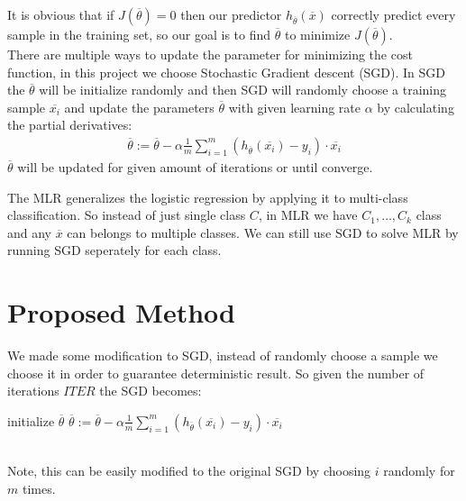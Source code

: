 \documentclass{sig-alternate-05-2015}
\begin{document}
It is obvious that if $J(\overline{\theta}) = 0$ then our predictor $h_{\overline{\theta}}(\overline{x})$ correctly predict every sample in the training set,
so our goal is to find $\overline{\theta}$ to minimize $J(\overline{\theta})$.\\
There are multiple ways to update the parameter for minimizing the cost function,
in this project we choose Stochastic Gradient descent (SGD).
In SGD the $\overline{\theta}$ will be initialize randomly and then SGD will randomly choose a training sample $\overline{x_i}$ and update the parameters $\overline{\theta}$ with given learning rate $\alpha$ by calculating the partial derivatives:
\begin {align} \label{eq:3}
\overline{\theta} := \overline{\theta} - \alpha \frac{1}{m} \sum_{i=1}^m (h_{\overline{\theta}} (\overline{x_i}) - y_i) \cdot \overline{x_i}
\end{align}
$\overline{\theta}$ will be updated for given amount of iterations or until converge.\par
The MLR generalizes the logistic regression by applying it to multi-class classification.
So instead of just single class $C$, in MLR we have $C_1, \ldots, C_k$ class and any $\overline{x}$
can belongs to multiple classes.
We can still use SGD to solve MLR by running SGD seperately for each class.
\section{Proposed Method}\label{sec:method}
We made some modification to SGD, instead of randomly choose a sample we choose it in order to guarantee deterministic result.
So given the number of iterations $ITER$ the SGD becomes:
\begin{algorithm}
  \begin{algorithmic}[1]
    \State initialize $\overline{\theta}$
    \State $\overline{\theta} := \overline{\theta} - \alpha \frac{1}{m} \sum_{i=1}^m (h_{\overline{\theta}} (\overline{x_i}) - y_i) \cdot \overline{x_i}$
    \EndFor
    \EndFor
  \end{algorithmic}
\end{algorithm}\\
Note, this can be easily modified to the original SGD by choosing $i$ randomly for $m$ times.\par
\end{document}
